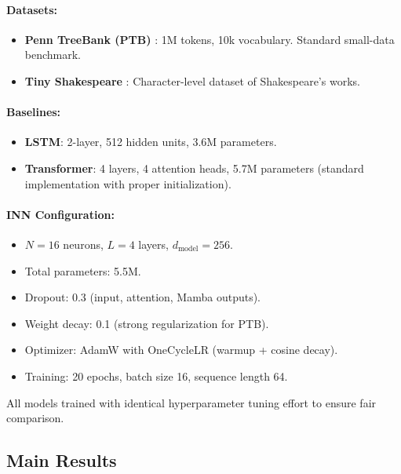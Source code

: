 \documentclass{article}
\begin{document}
\paragraph{Datasets:}
\begin{itemize}
    \item \textbf{Penn TreeBank (PTB)} \cite{marcus1993building}: 1M tokens, 10k vocabulary. Standard small-data benchmark.
    \item \textbf{Tiny Shakespeare} \cite{karpathy2015char}: Character-level dataset of Shakespeare's works.
\end{itemize}

\paragraph{Baselines:}
\begin{itemize}
    \item \textbf{LSTM}: 2-layer, 512 hidden units, 3.6M parameters.
    \item \textbf{Transformer}: 4 layers, 4 attention heads, 5.7M parameters (standard implementation with proper initialization).
\end{itemize}

\paragraph{INN Configuration:}
\begin{itemize}
    \item $N = 16$ neurons, $L = 4$ layers, $d_{\text{model}} = 256$.
    \item Total parameters: 5.5M.
    \item Dropout: 0.3 (input, attention, Mamba outputs).
    \item Weight decay: 0.1 (strong regularization for PTB).
    \item Optimizer: AdamW with OneCycleLR (warmup + cosine decay).
    \item Training: 20 epochs, batch size 16, sequence length 64.
\end{itemize}

All models trained with identical hyperparameter tuning effort to ensure fair comparison.

\subsection{Main Results}
\end{document}
